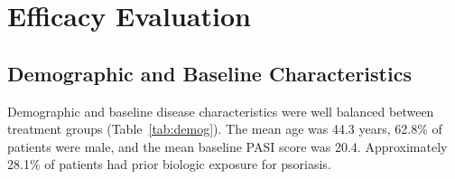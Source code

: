 \section{Efficacy Evaluation}

\subsection{Demographic and Baseline Characteristics}

Demographic and baseline disease characteristics were well balanced between treatment groups (Table~\ref{tab:demog}). The mean age was 44.3 years, 62.8\% of patients were male, and the mean baseline PASI score was 20.4. Approximately 28.1\% of patients had prior biologic exposure for psoriasis.

\vspace{4pt}
